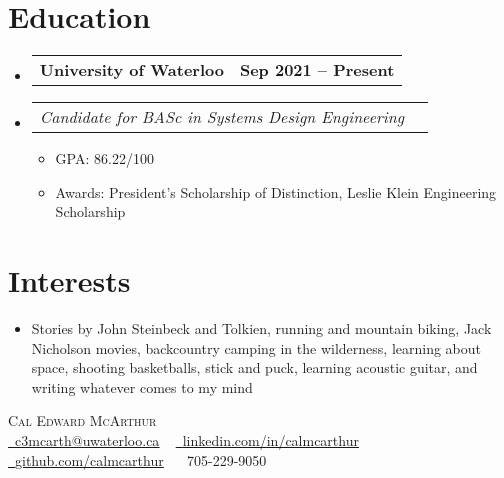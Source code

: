 \documentclass[letterpaper,11pt]{article}
\makeatletter
\newcommand{\subItem}[1]{
  \item\small{{#1 \vspace{-2pt}}}}
\newcommand{\subHeading}[2]{
  \vspace{-5pt}\item
  \begin{tabular*}{1.001\textwidth}{l@{\extracolsep{\fill}}r}
    \small#1 & \textbf{\small #2} 
    \setlength{\parskip}{6pt}
  \end{tabular*}\vspace{-7pt}}
\newcommand{\subHeadingListStart}{\begin{itemize}[leftmargin=0.0in, label={}]}
\newcommand{\subHeadingListEnd}{\end{itemize}}
\newcommand{\subItemListStart}{\begin{itemize}}
\newcommand{\subItemListEnd}{\end{itemize}\vspace{-5pt}}
\makeatother
\begin{document}
\section{\textcolor{main}{Education}}
  \subHeadingListStart

    \subHeading
      {\textbf{University of Waterloo}}
      {Sep 2021 -- Present}
      \vspace{-25pt}
    \subHeading
      {\emph{Candidate for BASc in Systems Design Engineering}}
      {\normalfont{\emph{Waterloo, Ontario}}}
    \subItemListStart
    \subItem{GPA: 86.22/100}
    \subItem{Awards: President's Scholarship of Distinction, Leslie Klein Engineering Scholarship}
    \subItemListEnd

  \subHeadingListEnd
\vspace{-18pt}

\section{\textcolor{main}{Interests}}
  \begin{itemize}[leftmargin=0in, label={}]
    \item\small{Stories by John Steinbeck and Tolkien, running and mountain biking, Jack Nicholson movies, backcountry camping in the wilderness, learning about space, shooting basketballs, stick and puck, learning acoustic guitar, and writing whatever comes to my mind}
  \end{itemize}
\vspace{-16pt}

\newpage


\begin{center}
  \textcolor{main}{\Huge\scshape Cal Edward McArthur} \\ \vspace{4pt}
  \href{mailto:c3mcarth@uwaterloo.ca}{\raisebox{-0.2\height}\faEnvelope\
    \underline{\textcolor{main}{c3mcarth@uwaterloo.ca}}} ~
  \href{https://linkedin.com/in/calmcarthur/}{\raisebox{-0.2\height}\faLinkedin\
    \underline{\textcolor{main}{linkedin.com/in/calmcarthur}}} ~
  \href{https://github.com/calmcarthur}{\raisebox{-0.2\height}\faGithub\
    \underline{\textcolor{main}{github.com/calmcarthur}}} ~
  \small\raisebox{-0.1\height}\faPhone\ 705-229-9050
  \vspace{-8pt}
\end{center}
\end{document}
